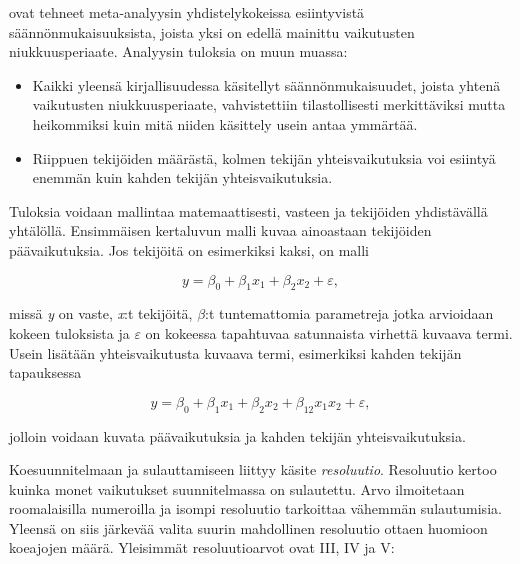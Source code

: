 \documentclass[12pt,a4paper,finnish]{tutthesis}
\begin{document}
\textcite{Li2006} ovat tehneet meta-analyysin yhdistelykokeissa esiintyvistä
säännönmukaisuuksista, joista yksi on edellä mainittu vaikutusten niukkuusperiaate.
Analyysin tuloksia on muun muassa:

\begin{itemize}
\item Kaikki yleensä kirjallisuudessa käsitellyt säännönmukaisuudet, joista yhtenä
    vaikutusten niukkuusperiaate, vahvistettiin tilastollisesti merkittäviksi mutta
    heikommiksi kuin mitä niiden käsittely usein antaa ymmärtää.
\item Riippuen tekijöiden määrästä, kolmen tekijän yhteisvaikutuksia voi esiintyä
    enemmän kuin kahden tekijän yhteisvaikutuksia.
\end{itemize}

Tuloksia voidaan mallintaa matemaattisesti, vasteen ja tekijöiden yhdistävällä
yhtälöllä. Ensimmäisen kertaluvun malli kuvaa ainoastaan tekijöiden päävaikutuksia.
Jos tekijöitä on esimerkiksi kaksi, on malli

\begin{equation}
  \label{eq:1krtluku}
 y = \beta _0 + \beta _{1}x_1 + \beta _{2}x_2 + \varepsilon,
\end{equation}

missä \textit{y} on vaste, \textit{x}:t tekijöitä, $\beta $:t tuntemattomia parametreja
jotka arvioidaan kokeen tuloksista ja $\varepsilon $ on
kokeessa tapahtuvaa satunnaista virhettä kuvaava termi.
Usein lisätään yhteisvaikutusta kuvaava termi, esimerkiksi kahden tekijän tapauksessa

\begin{equation}
  \label{eq:2krtluku}
 y = \beta _0 + \beta _{1}x_1 + \beta _{2}x_2 + \beta _{12}x_{1}x_{2} + \varepsilon,
\end{equation}

jolloin voidaan kuvata päävaikutuksia ja kahden tekijän yhteisvaikutuksia.



Koesuunnitelmaan ja sulauttamiseen liittyy käsite \textit{resoluutio}. Resoluutio
kertoo kuinka monet vaikutukset suunnitelmassa on sulautettu. Arvo ilmoitetaan
roomalaisilla numeroilla ja isompi resoluutio tarkoittaa vähemmän sulautumisia.
Yleensä on siis järkevää valita suurin mahdollinen resoluutio ottaen huomioon
koeajojen määrä. Yleisimmät resoluutioarvot ovat III, IV ja V:
\end{document}
